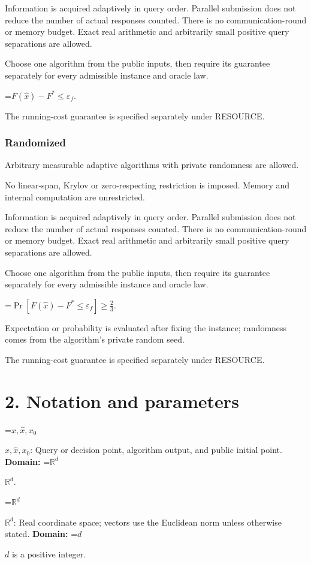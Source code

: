 \documentclass[10pt,a4paper]{article}
\newcommand{\AtlasMath}[1]{\par\begingroup\centering\setbox0=\hbox{$\displaystyle #1$}\ifdim\wd0>1.4\linewidth\typeout{ATLAS WIDE FORMULA: \the\wd0}\fi\ifdim\wd0>\linewidth\resizebox{\linewidth}{!}{\box0}\else\box0\fi\par\endgroup}
\newcommand{\AtlasInlineMath}[1]{\begingroup\setbox0=\hbox{$#1$}\ifdim\wd0>.4\linewidth\endgroup\AtlasMath{#1}\else\endgroup$#1$\fi}
\begin{document}
Information is acquired adaptively in query order. Parallel submission does not reduce the number of actual responses counted. There is no communication-round or memory budget. Exact real arithmetic and arbitrarily small positive query separations are allowed.

Choose one algorithm from the public inputs, then require its guarantee separately for every admissible instance and oracle law.


\AtlasMath{F(\widehat{x})-F^*\le \varepsilon_f.}


The running-cost guarantee is specified separately under RESOURCE.

\subsubsection{Randomized}
Arbitrary measurable adaptive algorithms with private randomness are allowed.

No linear-span, Krylov or zero-respecting restriction is imposed. Memory and internal computation are unrestricted.

Information is acquired adaptively in query order. Parallel submission does not reduce the number of actual responses counted. There is no communication-round or memory budget. Exact real arithmetic and arbitrarily small positive query separations are allowed.

Choose one algorithm from the public inputs, then require its guarantee separately for every admissible instance and oracle law.


\AtlasMath{\Pr\!\left[F(\widehat{x})-F^*\le \varepsilon_f\right]\ge\frac23.}


Expectation or probability is evaluated after fixing the instance; randomness comes from the algorithm's private random seed.

The running-cost guarantee is specified separately under RESOURCE.

\section{2. Notation and parameters}
\AtlasInlineMath{x,\widehat{x},x_0}: Query or decision point, algorithm output, and public initial point. \textbf{Domain:} \AtlasInlineMath{\mathbb{R}^d}.

\AtlasInlineMath{\mathbb{R}^d}: Real coordinate space; vectors use the Euclidean norm unless otherwise stated. \textbf{Domain:} \AtlasInlineMath{d} is a positive integer.
\end{document}
